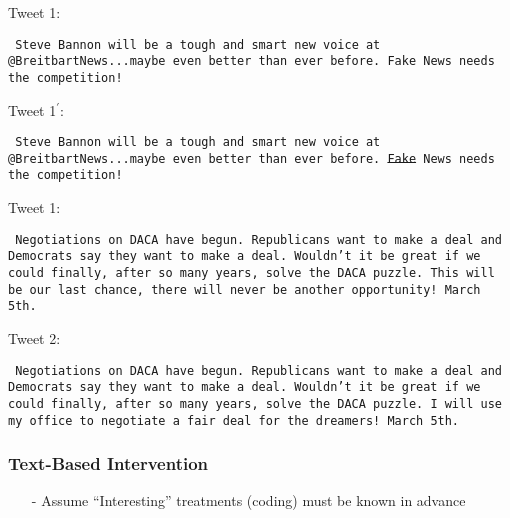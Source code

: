 \documentclass[xcolor=dvipsnames]{beamer}
\begin{document}
\begin{frame}


\alert{Tweet 1: }

  {\tt
  Steve Bannon will be a tough and smart new voice at @BreitbartNews...maybe even better than ever before. \alert{Fake} News needs the competition!
  }

\vspace{0.25in}

\alert{Tweet 1$^{'}$:}

{\tt
  Steve Bannon will be a tough and smart new voice at @BreitbartNews...maybe even better than ever before. \sout{\alert{Fake}} News needs the competition!
  }
\pause 

\vspace{0.125in}



\end{frame}



\begin{frame}

  \alert{Tweet 1: }

  {\tt
Negotiations on DACA have begun. Republicans want to make a deal and Democrats say they want to make a deal. Wouldn't it be great if we could finally, after so many years, solve the DACA puzzle. \alert{This will be our last chance, there will never be another opportunity!} March 5th.  }

  \vspace{0.25in}

  \alert{Tweet 2:}

  {\tt
Negotiations on DACA have begun. Republicans want to make a deal and Democrats say they want to make a deal. Wouldn't it be great if we could finally, after so many years, solve the DACA puzzle. \alert{I will use my office to negotiate a fair deal for the dreamers!} March 5th. } \\
  \vspace{0.25in}

  \Large
  \pause
{}

\end{frame}



\begin{frame}
  \frametitle{Text-Based Intervention}

\Large

  \begin{itemize}
    \item[-] Assume ``Interesting'' treatments (coding) must be known in advance \pause   \medskip
     \pause
  \end{itemize}
 \end{frame}
\end{document}
